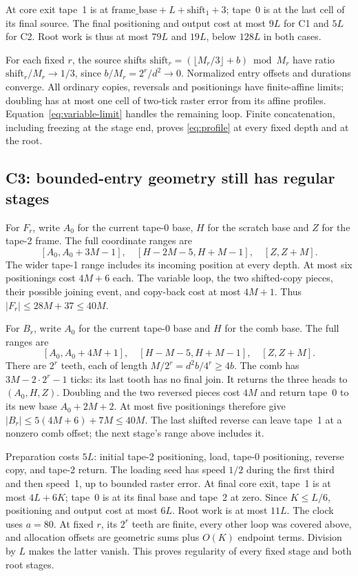 At core exit tape~1 is at $\mathrm{frame\_base}+L+\mathrm{shift}_1+3$;
tape~0 is at the last cell of its final source. The final positioning
and output cost at most $9L$ for C1 and $5L$ for C2. Root work is thus
at most $79L$ and $19L$, below $128L$ in both cases.

For each fixed $r$, the source shifts
$\mathrm{shift}_r=(\lfloor M_r/3\rfloor+b)\bmod M_r$ have ratio
$\mathrm{shift}_r/M_r\to1/3$, since $b/M_r=2^r/d^2\to0$.
Normalized entry offsets and durations converge. All ordinary copies,
reversals and positionings have finite-affine limits; doubling has at most
one cell of two-tick raster error from its affine profiles.
Equation~\eqref{eq:variable-limit}
handles the remaining loop. Finite concatenation, including freezing at
the stage end, proves \eqref{eq:profile} at every fixed depth and at
the root.

\subsection{C3: bounded-entry geometry still has regular stages}

For $F_r$, write $A_0$ for the current tape-0 base, $H$ for the scratch
base and $Z$ for the tape-2 frame. The full coordinate ranges are
\[
 [A_0,A_0+3M-1],\quad[H-2M-5,H+M-1],\quad[Z,Z+M].
\]
The wider tape-1 range includes its incoming position at every depth.
At most six positionings cost $4M+6$ each. The variable loop, the two
shifted-copy pieces, their possible joining event, and copy-back cost
at most $4M+1$. Thus $|F_r|\le28M+37\le40M$.

For $B_r$, write $A_0$ for the current tape-0 base and $H$ for the comb
base. The full ranges are
\[
 [A_0,A_0+4M+1],\quad[H-M-5,H+M-1],\quad[Z,Z+M].
\]
There are $2^r$ teeth, each of length $M/2^r=d^2b/4^r\ge4b$.
The comb has $3M-2\cdot2^r-1$ ticks: its last tooth has no final join.
It returns the three heads to $(A_0,H,Z)$. Doubling and the two reversed
pieces cost $4M$ and return tape~0 to its new base $A_0+2M+2$.
At most five positionings therefore give
$|B_r|\le5(4M+6)+7M\le40M$. The last shifted reverse can leave
tape~1 at a nonzero comb offset; the next stage's range above includes it.

Preparation costs $5L$: initial tape-2 positioning, load, tape-0
positioning, reverse copy, and tape-2 return. The loading seed has speed
$1/2$ during the first third and then speed~1, up to bounded raster error.
At final core exit, tape~1 is at most $4L+6K$; tape~0 is at its final
base and tape~2 at zero. Since $K\le L/6$, positioning and output cost
at most $6L$. Root work is at most $11L$.
The clock uses $a=80$. At fixed $r$, its $2^r$ teeth are finite, every
other loop was covered above, and allocation offsets are geometric sums
plus $O(K)$ endpoint terms. Division by $L$ makes the latter vanish.
This proves regularity of every fixed stage and both root stages.

